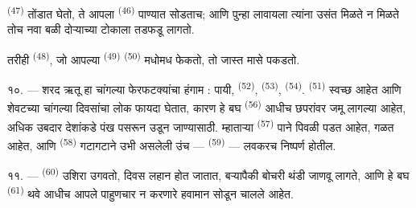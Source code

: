  \textsuperscript{(47)}  तोंडात घेतो, ते आपला 
\textsuperscript{(46)} पाण्यात सोडताच; आणि  पुन्हा लावायला त्यांना उसंत मिळते न
मिळते तोच नवा बळी दोऱ्याच्या टोकाला तडफडू लागतो.

तरीही  \textsuperscript{(48)}, जो आपल्या 
\textsuperscript{(49)}  \textsuperscript{(50)} मधोमध  फेकतो, तो
जास्त मासे पकडतो.

१०. --- शरद ऋतू हा चांगल्या फेरफटक्यांचा हंगाम : पायी, 
\textsuperscript{(52)},  \textsuperscript{(53)}, 
\textsuperscript{(54)}.  \textsuperscript{(51)} स्वच्छ आहेत आणि शेवटच्या
चांगल्या दिवसांचा लोक फायदा घेतात, कारण हे बघ  \textsuperscript{(56)} आधीच
छपरांवर जमू लागल्या आहेत, अधिक उबदार देशांकडे पंख पसरून उडून जाण्यासाठी. म्हाताऱ्या
 \textsuperscript{(57)} पाने पिवळी पडत आहेत,  गळत
आहेत, आणि  \textsuperscript{(58)} गटागटाने उभी असलेली उंच
 —  \textsuperscript{(59)} — लवकरच निष्पर्ण होतील.

११. ---  \textsuperscript{(60)} उशिरा उगवतो, दिवस लहान होत जातात, 
बऱ्यापैकी बोचरी थंडी जाणवू लागते, आणि हे बघ  \textsuperscript{(61)} थवे आधीच
आपले पाहुणचार न करणारे हवामान सोडून चालले आहेत.

\VUsaut{6.0mm}
\VUfilet{22mm}

